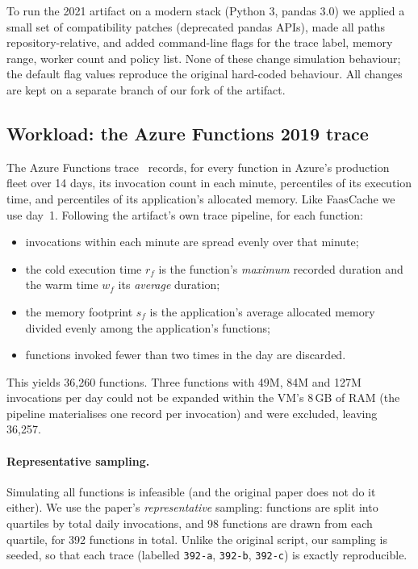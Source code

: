 \documentclass[11pt,a4paper]{article}
\newcommand{\code}[1]{\texttt{#1}}
\begin{document}
To run the 2021 artifact on a modern stack (Python 3, pandas 3.0) we applied a small set of
compatibility patches (deprecated pandas APIs), made all paths repository-relative, and added
command-line flags for the trace label, memory range, worker count and policy list. None of
these change simulation behaviour; the default flag values reproduce the original hard-coded
behaviour. All changes are kept on a separate branch of our fork of the artifact.

\subsection{Workload: the Azure Functions 2019 trace}
The Azure Functions trace~\cite{shahrad2020serverless,azuredataset2019} records, for every
function in Azure's production fleet over 14 days, its invocation count in each minute,
percentiles of its execution time, and percentiles of its application's allocated memory.
Like FaasCache we use day~1. Following the artifact's own trace pipeline, for each function:
\begin{itemize}
  \item invocations within each minute are spread evenly over that minute;
  \item the cold execution time $r_f$ is the function's \emph{maximum} recorded duration and
        the warm time $w_f$ its \emph{average} duration;
  \item the memory footprint $s_f$ is the application's average allocated memory divided
        evenly among the application's functions;
  \item functions invoked fewer than two times in the day are discarded.
\end{itemize}
This yields 36,260 functions. Three functions with 49M, 84M and 127M invocations per day
could not be expanded within the VM's 8\,GB of RAM (the pipeline materialises one record
per invocation) and were excluded, leaving 36,257.

\paragraph{Representative sampling.} Simulating all functions is infeasible (and the
original paper does not do it either). We use the paper's \emph{representative} sampling:
functions are split into quartiles by total daily invocations, and 98 functions are drawn
from each quartile, for 392 functions in total. Unlike the original script, our sampling is
seeded, so that each trace (labelled \code{392-a}, \code{392-b}, \code{392-c}) is exactly
reproducible.
\end{document}
